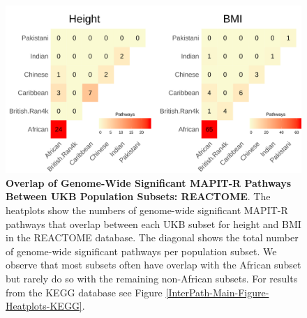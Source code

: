 \documentclass[12pt, a4paper]{article}
\begin{document}

\setlength{\footskip}{1cm}
\begin{figure}[htbp]
\centering
\vspace*{-2cm}
\includegraphics[scale=.225]{Images/Supp/InterPath_Supp_Figure_Heatplots_REACTOME_vs3.png}
\caption[TBD]{\textbf{Overlap of Genome-Wide Significant MAPIT-R Pathways Between UKB Population Subsets: REACTOME}. The heatplots show the numbers of genome-wide significant MAPIT-R pathways that overlap between each UKB subset for height and BMI in the REACTOME database. The diagonal shows the total number of genome-wide significant pathways per population subset. We observe that most subsets often have overlap with the African subset but rarely do so with the remaining non-African subsets. For results from the KEGG database see Figure \ref{InterPath-Main-Figure-Heatplots-KEGG}.}
\label{InterPath-Supp-Figure-Heatplots-REACTOME}
\end{figure}
\clearpage
\setlength{\footskip}{1cm}

\end{document}
